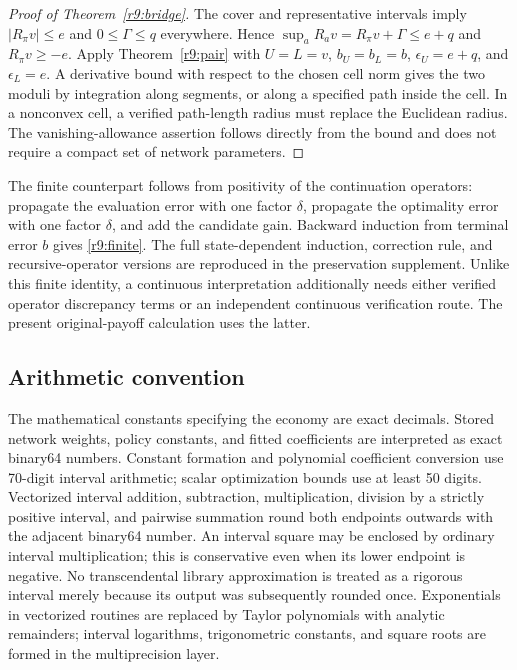 \begin{proof}[Proof of Theorem~\ref{r9:bridge}]
The cover and representative intervals imply $|R_\pi v|\leq e$ and $0\leq\Gamma\leq q$ everywhere. Hence $\sup_aR_av=R_\pi v+\Gamma\leq e+q$ and $R_\pi v\geq-e$. Apply Theorem~\ref{r9:pair} with $U=L=v$, $b_U=b_L=b$, $\epsilon_U=e+q$, and $\epsilon_L=e$. A derivative bound with respect to the chosen cell norm gives the two moduli by integration along segments, or along a specified path inside the cell. In a nonconvex cell, a verified path-length radius must replace the Euclidean radius. The vanishing-allowance assertion follows directly from the bound and does not require a compact set of network parameters.
\end{proof}
The finite counterpart follows from positivity of the continuation operators: propagate the evaluation error with one factor $\delta$, propagate the optimality error with one factor $\delta$, and add the candidate gain. Backward induction from terminal error $b$ gives \eqref{r9:finite}. The full state-dependent induction, correction rule, and recursive-operator versions are reproduced in the preservation supplement. Unlike this finite identity, a continuous interpretation additionally needs either verified operator discrepancy terms or an independent continuous verification route. The present original-payoff calculation uses the latter.

\subsection{Arithmetic convention}
The mathematical constants specifying the economy are exact decimals. Stored network weights, policy constants, and fitted coefficients are interpreted as exact binary64 numbers. Constant formation and polynomial coefficient conversion use 70-digit interval arithmetic; scalar optimization bounds use at least 50 digits. Vectorized interval addition, subtraction, multiplication, division by a strictly positive interval, and pairwise summation round both endpoints outwards with the adjacent binary64 number. An interval square may be enclosed by ordinary interval multiplication; this is conservative even when its lower endpoint is negative. No transcendental library approximation is treated as a rigorous interval merely because its output was subsequently rounded once. Exponentials in vectorized routines are replaced by Taylor polynomials with analytic remainders; interval logarithms, trigonometric constants, and square roots are formed in the multiprecision layer.


